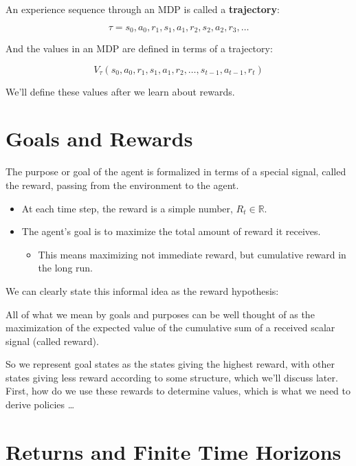 \documentclass[11pt]{article}
\renewenvironment{quote}{\begin{shaded*}\begin{oldquote}}{\end{oldquote}\end{shaded*}}
\begin{document}
An experience sequence through an MDP is called a \textbf{trajectory}:

\begin{equation*}
\tau = s_0, a_0, r_1, s_1, a_1, r_2, s_2, a_2, r_3, \dots
\end{equation*}

And the values in an MDP are defined in terms of a trajectory:

\begin{equation*}
V_{\tau}(s_0, a_0, r_1, s_1, a_1, r_2, \dots, s_{t-1}, a_{t-1}, r_t)
\end{equation*}

We'll define these values after we learn about rewards.
\section{Goals and Rewards}
\label{sec:org33f2234}

The purpose or goal of the agent is formalized in terms of a special signal, called the reward, passing from the environment to the agent.

\begin{itemize}
\item At each time step, the reward is a simple number, \(R_t \in \mathbb{R}\).
\item The agent’s goal is to maximize the total amount of reward it receives.

\begin{itemize}
\item This means maximizing not immediate reward, but cumulative reward in the long run.
\end{itemize}
\end{itemize}

We can clearly state this informal idea as the reward hypothesis:

\begin{quote}
All of what we mean by goals and purposes can be well thought of as the maximization of the expected value of the cumulative sum of a received scalar signal (called reward).
\end{quote}

So we represent goal states as the states giving the highest reward, with other states giving less reward according to some structure, which we'll discuss later.  First, how do we use these rewards to determine values, which is what we need to derive policies \ldots{}
\section{Returns and Finite Time Horizons}
\label{sec:org3094a04}
\end{document}
